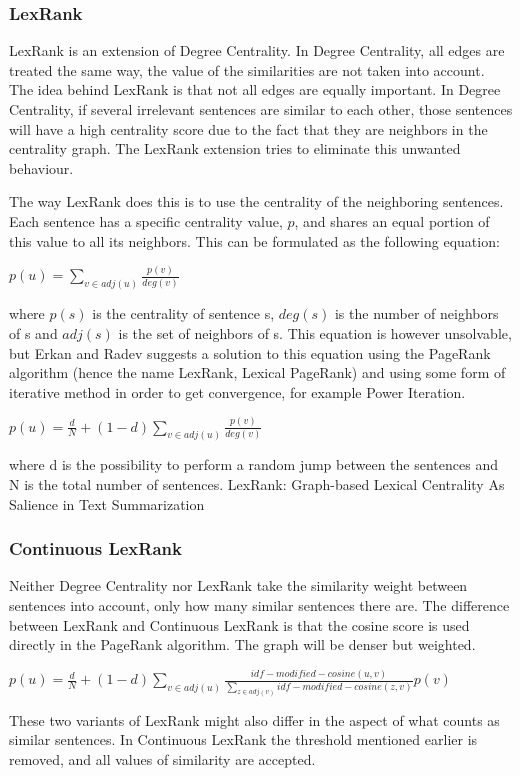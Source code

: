 \documentclass[10pt, a4paper]{article}
\begin{document}
\subsubsection{LexRank}
LexRank is an extension of Degree Centrality. In Degree Centrality, all edges are treated the same way, the value of the similarities are not taken into account. The idea behind LexRank is that not all edges are equally important. In Degree Centrality, if several irrelevant sentences are similar to each other, those sentences will have a high centrality score due to the fact that they are neighbors in the centrality graph. The LexRank extension tries to eliminate this unwanted behaviour.

The way LexRank does this is to use the centrality of the neighboring sentences. Each sentence has a specific centrality value, $p$, and shares an equal portion of this value to all its neighbors. This can be formulated as the following equation:

$p(u) = \sum_{v \in adj(u)} \frac{p(v)}{deg(v)}$

where $p(s)$ is the centrality of sentence s, $deg(s)$ is the number of neighbors of s and $adj(s)$ is the set of neighbors of s.
This equation is however unsolvable, but Erkan and Radev suggests a solution to this equation using the PageRank algorithm (hence the name LexRank, Lexical PageRank) and using some form of iterative method in order to get convergence, for example Power Iteration. 

$p(u) = \frac{d}{N} + (1-d) \sum_{v \in adj(u)} \frac{p(v)}{deg(v)}$

where d is the possibility to perform a random jump between the sentences and N is the total number of sentences. 
LexRank: Graph-based Lexical Centrality As Salience in Text Summarization

\subsubsection{Continuous LexRank}
Neither Degree Centrality nor LexRank take the similarity weight between sentences into account, only how many similar sentences there are. The difference between LexRank and Continuous LexRank is that the cosine score is used directly in the PageRank algorithm. The graph will be denser but weighted. 

$p(u) = \frac{d}{N} + (1-d) \sum_{v \in adj(u)} \frac{idf-modified-cosine(u,v)}{\sum_{z \in adj(v)} idf-modified-cosine(z,v)} p(v)$

These two variants of LexRank might also differ in the aspect of what counts as similar sentences. In Continuous LexRank the threshold mentioned earlier is removed, and all values of similarity are accepted.
\end{document}
